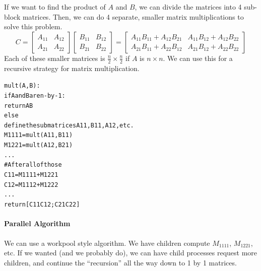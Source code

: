 \documentclass[12pt]{article}
\numberwithin{equation}{section}
\theoremstyle{theorem}
\theoremstyle{definition}
\theoremstyle{remark}
\begin{document}
If we want to find the product of $A$ and $B$, we can divide the matrices into 4 sub-block matrices.  Then, we can do 4 separate, smaller matrix multiplications to solve this problem.
\begin{equation}
C = \begin{bmatrix}A_{11} & A_{12} \\ A_{21} & A_{22}\end{bmatrix}\begin{bmatrix}B_{11} & B_{12} \\ B_{21} & B_{22} \end{bmatrix} = \begin{bmatrix} A_{11}B_{11}  + A_{12}B_{21} & A_{11}B_{12} + A_{12}B_{22} \\ A_{21}B_{11} + A_{22}B_{12} & A_{21}B_{12} + A_{22}B_{22} \end{bmatrix}
\end{equation}
Each of these smaller matrices is $\frac{n}{2} \times \frac{n}{2}$ if $A$ is $n \times n$.  We can use this for a recursive strategy for matrix multiplication.
\begin{alltt}
mult(A, B):
 if A and B are n-by-1:
  return AB
 else
  define the submatrices A11, B11, A12, etc.
  M1111 = mult(A11, B11)
  M1221 = mult(A12, B21)
  ...
  \# After all of those
  C11 = M1111 + M1221
  C12 = M1112 + M1222
  ...
  return [C11 C12; C21 C22]
\end{alltt}

\paragraph{Parallel Algorithm} We can use a workpool style algorithm.  We have children compute $M_{1111}$, $M_{1221}$, etc.  If we wanted (and we probably do), we can have child processes request more children, and continue the ``recursion'' all the way down to 1 by 1 matrices.   
\end{document}
